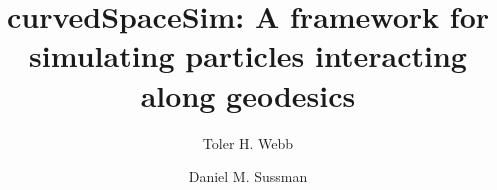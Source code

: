 \documentclass[preprint,12pt]{elsarticle}
\begin{document}
\begin{frontmatter}



\title{curvedSpaceSim: A framework for simulating particles interacting along geodesics}

\author{Toler H. Webb}
\author{Daniel M. Sussman}


\address{400 Dowman Dr., Emory University, Atlanta, GA, 30322}


\end{frontmatter}
\end{document}
